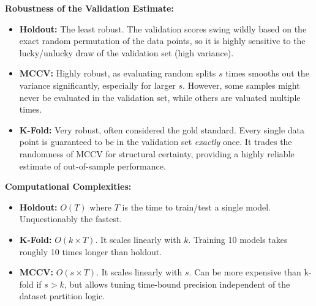 \documentclass[a4paper,12pt]{article}
\begin{document}
\begin{enumerate}
\begin{enumerate}
        \textbf{Robustness of the Validation Estimate:} 
        \begin{itemize}
            \item \textbf{Holdout:} The least robust. The validation scores swing wildly based on the exact random permutation of the data points, so it is highly sensitive to the lucky/unlucky draw of the validation set (high variance).
            \item \textbf{MCCV:} Highly robust, as evaluating random splits $s$ times smooths out the variance significantly, especially for larger $s$. However, some samples might never be evaluated in the validation set, while others are valuated multiple times.
            \item \textbf{K-Fold:} Very robust, often considered the gold standard. Every single data point is guaranteed to be in the validation set \textit{exactly} once. It trades the randomness of MCCV for structural certainty, providing a highly reliable estimate of out-of-sample performance.
        \end{itemize}
        \textbf{Computational Complexities:}
        \begin{itemize}
            \item \textbf{Holdout:} $O(T)$ where $T$ is the time to train/test a single model. Unquestionably the fastest.
            \item \textbf{K-Fold:} $O(k \times T)$. It scales linearly with $k$. Training 10 models takes roughly 10 times longer than holdout.
            \item \textbf{MCCV:} $O(s \times T)$. It scales linearly with $s$. Can be more expensive than k-fold if $s > k$, but allows tuning time-bound precision independent of the dataset partition logic.
        \end{itemize}
    \end{enumerate}
\end{enumerate}
\end{document}
